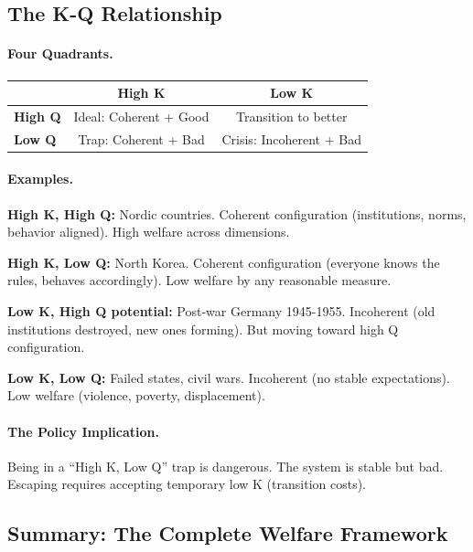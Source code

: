\documentclass[12pt,a4paper]{article}
\begin{document}
\subsection{The K-Q Relationship}

\paragraph{Four Quadrants.}
\begin{center}
\renewcommand{\arraystretch}{1.3}
\begin{tabular}{lcc}
\hline
& \textbf{High K} & \textbf{Low K} \\
\hline
\textbf{High Q} & Ideal: Coherent + Good & Transition to better \\
\textbf{Low Q} & Trap: Coherent + Bad & Crisis: Incoherent + Bad \\
\hline
\end{tabular}
\end{center}

\paragraph{Examples.}

\textbf{High K, High Q:} Nordic countries.
Coherent configuration (institutions, norms, behavior aligned).
High welfare across dimensions.

\textbf{High K, Low Q:} North Korea.
Coherent configuration (everyone knows the rules, behaves accordingly).
Low welfare by any reasonable measure.

\textbf{Low K, High Q potential:} Post-war Germany 1945-1955.
Incoherent (old institutions destroyed, new ones forming).
But moving toward high Q configuration.

\textbf{Low K, Low Q:} Failed states, civil wars.
Incoherent (no stable expectations).
Low welfare (violence, poverty, displacement).

\paragraph{The Policy Implication.}
Being in a ``High K, Low Q'' trap is dangerous.
The system is stable but bad.
Escaping requires accepting temporary low K (transition costs).

\subsection{Summary: The Complete Welfare Framework}
\end{document}
